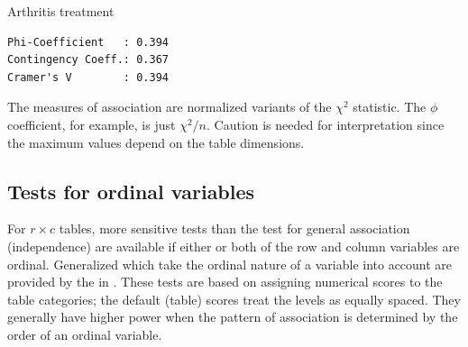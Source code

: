 \documentclass[10pt,krantz2]{krantz}\usepackage[]{graphicx}\usepackage[]{color}
\makeatletter
\newenvironment{kframe}{%
 \def\at@end@of@kframe{}%
 \ifinner\ifhmode%
  \def\at@end@of@kframe{\end{minipage}}%
  \begin{minipage}{\columnwidth}%
 \fi\fi%
 \def\FrameCommand##1{\hskip\@totalleftmargin \hskip-\fboxsep
 \colorbox{shadecolor}{##1}\hskip-\fboxsep
     \hskip-\linewidth \hskip-\@totalleftmargin \hskip\columnwidth}%
 \MakeFramed {\advance\hsize-\width
   \@totalleftmargin\z@ \linewidth\hsize
   \@setminipage}}%
 {\par\unskip\endMakeFramed%
 \at@end@of@kframe}
\newenvironment{knitrout}{}{} %
\renewenvironment{knitrout}{\small\renewcommand{\baselinestretch}{.85}}{} %
\makeatother
\begin{document}
\begin{Example}[arthrit2]{Arthritis treatment}
\begin{knitrout}
\begin{kframe}
\begin{verbatim}
Phi-Coefficient   : 0.394 
Contingency Coeff.: 0.367 
Cramer's V        : 0.394 
\end{verbatim}
\end{kframe}
\end{knitrout}
\end{Example}
\noindent The measures of association are normalized variants of the
$\chi^2$ statistic. The $\phi$ coefficient, for example, is just
$\chi^2/n$. Caution is needed for interpretation since the maximum
values depend on the table dimensions.

\subsection{Tests for ordinal variables}\label{sec:ordinaltests}

For \(r \times  c\) tables, more sensitive tests
than the test for general association (independence)
are available if
either or both of the row and column variables are
ordinal. Generalized 
\citep{Landis-etal:1978}
which take the ordinal nature of a variable into
account are provided by the  in .
These tests are based on assigning numerical scores to
the table categories;  the default (table) scores treat the levels as
equally spaced.  They generally have higher power when the pattern of
association is determined by the order of an ordinal variable.
\end{document}
